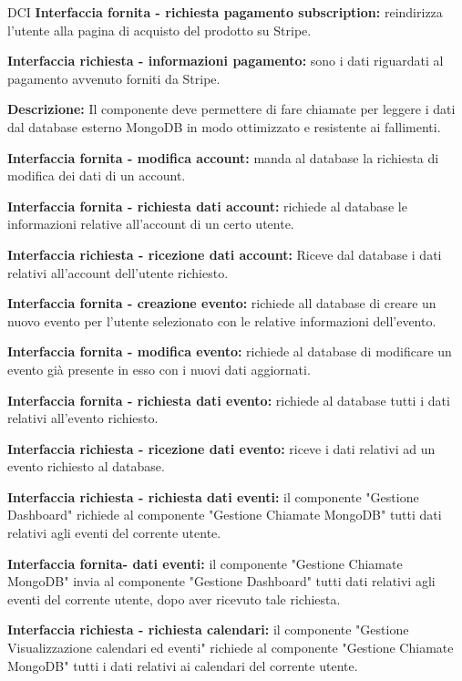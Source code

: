 \begin{listaPersonale}{DCI}
    \textbf{Interfaccia fornita - richiesta pagamento subscription:} reindirizza l'utente alla pagina di acquisto del prodotto su Stripe.

    \textbf{Interfaccia richiesta - informazioni pagamento:} sono i dati riguardati al pagamento avvenuto forniti da Stripe.



    \textbf{Descrizione:} Il componente deve permettere di fare chiamate per leggere i dati dal database esterno MongoDB in modo ottimizzato e resistente ai fallimenti.

    \textbf{Interfaccia fornita - modifica account:} manda al database la richiesta di modifica dei dati di un account.

    \textbf{Interfaccia fornita - richiesta dati account:} richiede al database le informazioni relative all'account di un certo utente.

    \textbf{Interfaccia richiesta - ricezione dati account:} Riceve dal database i dati relativi all'account dell'utente richiesto.

    \textbf{Interfaccia fornita - creazione evento:} richiede all database di creare un nuovo evento per l'utente selezionato con le relative informazioni dell'evento.

    \textbf{Interfaccia fornita - modifica evento:} richiede al database di modificare un evento già presente in esso con i nuovi dati aggiornati.

    \textbf{Interfaccia fornita - richiesta dati evento:} richiede al database tutti i dati relativi all'evento richiesto.

    \textbf{Interfaccia richiesta - ricezione dati evento:} riceve i dati relativi ad un evento richiesto al database.

    \textbf{Interfaccia richiesta - richiesta dati eventi:} il componente "Gestione Dashboard" richiede al componente "Gestione Chiamate MongoDB" tutti dati relativi agli eventi del corrente utente.

    \textbf{Interfaccia fornita- dati eventi:} il componente "Gestione Chiamate MongoDB" invia al componente "Gestione Dashboard" tutti dati relativi agli eventi del corrente utente, dopo aver ricevuto tale richiesta.

    \textbf{Interfaccia richiesta - richiesta calendari:} il componente "Gestione Visualizzazione calendari ed eventi" richiede al componente "Gestione Chiamate MongoDB" tutti i dati relativi ai calendari del corrente utente.


\end{listaPersonale}
